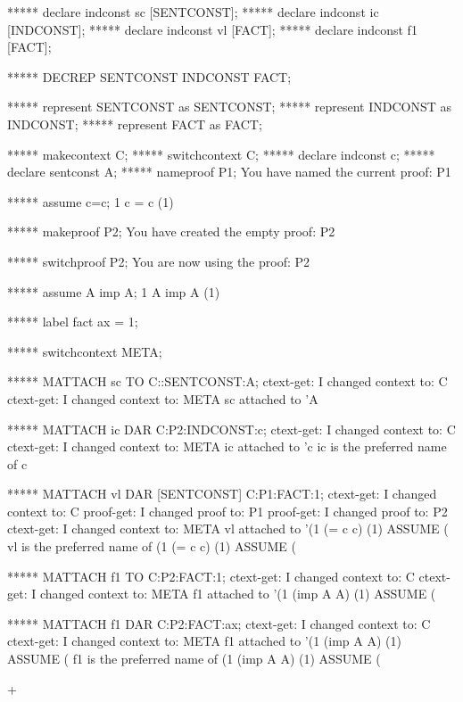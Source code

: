    ***** declare indconst sc [SENTCONST];
   ***** declare indconst ic [INDCONST];
   ***** declare indconst vl [FACT];
   ***** declare indconst f1 [FACT];

   ***** DECREP  SENTCONST INDCONST FACT;

   ***** represent { SENTCONST } as SENTCONST;
   ***** represent { INDCONST } as INDCONST;
   ***** represent { FACT } as FACT;

   ***** makecontext C;
   ***** switchcontext C;
   ***** declare indconst c;
   ***** declare sentconst A;
   ***** nameproof P1;
   You have named the current proof: P1

   ***** assume c=c;
   1   c = c     (1)

   ***** makeproof P2;
   You have created the empty proof: P2

   ***** switchproof P2;
   You are now using the proof: P2

   ***** assume A imp A;
   1   A imp A     (1)

   ***** label fact ax = 1;

   ***** switchcontext META;

   ***** MATTACH sc TO  C::SENTCONST:A;
   ctext-get: I changed context to: C
   ctext-get: I changed context to: META
   sc attached to 'A

   ***** MATTACH ic DAR C:P2:INDCONST:c;
   ctext-get: I changed context to: C
   ctext-get: I changed context to: META
   ic attached to 'c
   ic is the preferred name of c

   ***** MATTACH vl DAR [SENTCONST] C:P1:FACT:1;
   ctext-get: I changed context to: C
   proof-get: I changed proof to: P1
   proof-get: I changed proof to: P2
   ctext-get: I changed context to: META
   vl attached to '(1 (= c c) (1) ASSUME (%
   vl is the preferred name of (1 (= c c) (1) ASSUME (%

   ***** MATTACH f1 TO  C:P2:FACT:1;
   ctext-get: I changed context to: C
   ctext-get: I changed context to: META
   f1 attached to '(1 (imp A A) (1) ASSUME (%

   ***** MATTACH f1 DAR C:P2:FACT:ax;
   ctext-get: I changed context to: C
   ctext-get: I changed context to: META
   f1 attached to '(1 (imp A A) (1) ASSUME (%
   f1 is the preferred name of (1 (imp A A) (1) ASSUME (%

+

\gfnotes{}

